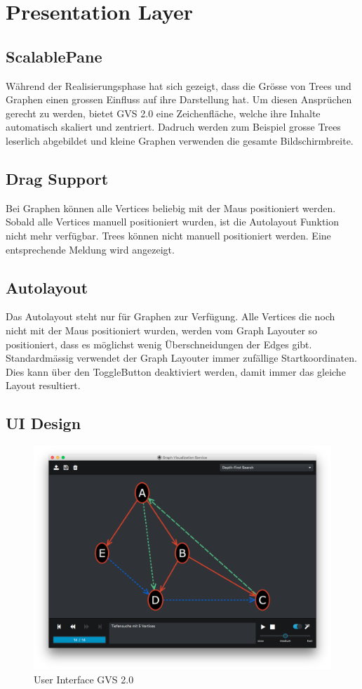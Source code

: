 \documentclass[11pt,a4paper,english,oneside]{book}
\numberwithin{equation}{chapter}
\begin{document}
	
	
	
	
	\section{Presentation Layer}
	
	\subsection{ScalablePane}
	Während der Realisierungsphase hat sich gezeigt, dass die Grösse von Trees und Graphen einen grossen Einfluss auf ihre Darstellung hat. Um diesen Ansprüchen gerecht zu werden, bietet GVS 2.0 eine Zeichenfläche, welche ihre Inhalte automatisch skaliert und zentriert. Dadruch werden zum Beispiel grosse Trees leserlich abgebildet und kleine Graphen verwenden die gesamte Bildschirmbreite. 
	
	\subsection{Drag Support}
	Bei Graphen können alle Vertices beliebig mit der Maus positioniert werden. Sobald alle Vertices manuell positioniert wurden, ist die Autolayout Funktion nicht mehr verfügbar. Trees können nicht manuell positioniert werden. Eine entsprechende Meldung wird angezeigt.
		
	\subsection{Autolayout}
	Das Autolayout steht nur für Graphen zur Verfügung. Alle Vertices die noch nicht mit der Maus positioniert wurden, werden vom Graph Layouter so positioniert, dass es möglichst wenig Überschneidungen der Edges gibt. Standardmässig verwendet der Graph Layouter immer zufällige Startkoordinaten. Dies kann über den ToggleButton deaktiviert werden, damit immer das gleiche Layout resultiert.
	
	
	\subsection{UI Design}
	\begin{figure}[h!]
		\centering
		\includegraphics[width=0.7\linewidth]{assets/images/gvs-ui-graph}
		\caption{User Interface GVS 2.0}
		\label{fig:gvs-ui-graph}
	\end{figure}
\end{document}
